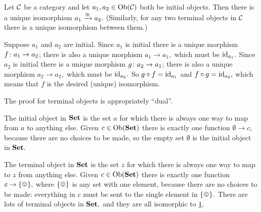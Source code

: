 \documentclass[CT4S-EN-RU]{subfiles}
\begin{document}
\begin{warningRUS}
\end{warningRUS}

\begin{propositionENG}\label{prop:initials are isomorphic}
Let $\mathcal{C}$ be a category and let $a_1,a_2\in\textnormal{Ob}(\mathcal{C})$ both be initial objects. Then there is a unique isomorphism $a_1\xrightarrow{\cong}a_2.$ (Similarly, for any two terminal objects in $\mathcal{C}$ there is a unique isomorphism between them.) 
\end{propositionENG}

\begin{propositionRUS}\label{prop:initials are isomorphic}
\end{propositionRUS}

\begin{proofENG}
Suppose $a_1$ and $a_2$ are initial. Since $a_1$ is initial there is a unique morphism $f\colon a_1\rightarrow a_2$; there is also a unique morphism $a_1\to a_1,$ which must be $\textnormal{id}_{a_1}.$ Since $a_2$ is initial there is a unique morphism $g\colon a_2\rightarrow a_1$; there is also a unique morphism $a_2\to a_2,$ which must be $\textnormal{id}_{a_2}.$ So $g\circ f=\textnormal{id}_{a_1}$ and $f\circ g=\textnormal{id}_{a_2},$ which means that $f$ is the desired (unique) isomorphism.

The proof for terminal objects is appropriately “dual”.
\end{proofENG}

\begin{proofRUS}
\end{proofRUS}

\begin{exampleENG}\label{ex:universal obs in set}
The initial object in ${\mathbf{Set}}$ is the set $a$ for which there is always one way to map from $a$ to anything else. Given $c\in\textnormal{Ob}({\mathbf{Set}})$ there is exactly one function $\emptyset\to c,$ because there are no choices to be made, so the empty set $\emptyset$ is the initial object in ${\mathbf{Set}}.$

The terminal object in ${\mathbf{Set}}$ is the set $z$ for which there is always one way to map to $z$ from anything else. Given $c\in\textnormal{Ob}({\mathbf{Set}})$ there is exactly one function $c\to\singleton,$ where $\singleton$ is any set with one element, because there are no choices to be made: everything in $c$ must be sent to the single element in $\singleton.$ There are lots of terminal objects in ${\mathbf{Set}},$ and they are all isomorphic to $\underline{1}.$
\end{exampleENG}
\end{document}
